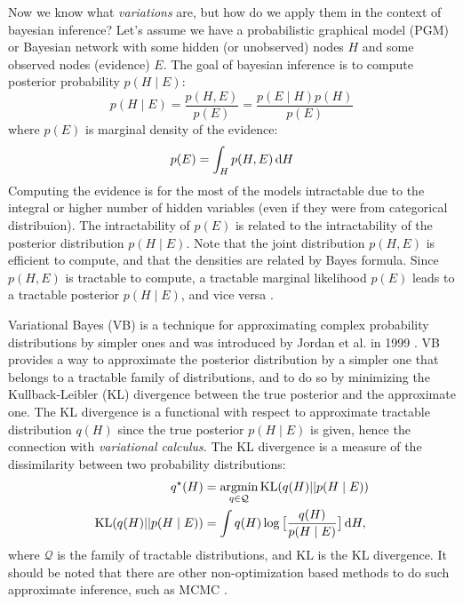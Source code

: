 Now we know what \textit{variations} are, but how do we apply them in the context of bayesian inference? Let's assume we have a probabilistic
graphical model (PGM) or Bayesian network \cite{graphical-models-2023} with some hidden (or unobserved) nodes $H$ and some observed nodes (evidence) $E$. The goal 
of bayesian inference is to compute posterior probability $p(H\mid E)$:
$$
p(H \mid E) = \frac{p(H,E)}{p(E)} = \frac{p(E\mid H) p(H)}{p(E)}
$$ 
where $p(E)$ is marginal density of the evidence:
$$
p(E) = \int_{H} p(H,E)\, \mbox{\rm d}H
$$
Computing the evidence is for the most of the models intractable due to the integral or higher number of hidden variables (even if they were from
categorical distribuion). The intractability of $p(E)$ is related to the intractability of the
posterior distribution $p(H \mid E)$. Note that the joint distribution $p(H, E)$ is efficient to compute, and that the densities are related by Bayes formula.
Since $p(H, E)$ is tractable to compute, a tractable marginal likelihood $p(E)$ leads to a tractable posterior $p(H \mid E)$, and vice versa \cite{intro-vae-2019,vb-intro-1999}.
 
Variational Bayes (VB) is a technique for approximating complex probability distributions by simpler ones and was introduced by Jordan et al. in 1999 \cite{vb-intro-1999}. 
VB provides a way to approximate the posterior distribution by a simpler one that belongs to a tractable family of distributions, and to do so
by minimizing the Kullback-Leibler (KL) divergence between the true posterior and the approximate one. The KL divergence is a functional with respect 
to approximate tractable distribution $q(H)$ since the true posterior $p(H \mid E)$ is given, hence the connection with \textit{variational calculus}.  
The KL divergence is a measure of the dissimilarity between two probability distributions:
\begin{align*}
q^\star(H) &= \mathop{\rm argmin}_{q \in \mathcal{Q}} \mathrm{KL}(q(H) || p(H  \mid  E)) \\
\mathrm{KL}(q(H) || p(H \mid E)) &= \int q(H) \log \big[ \frac{q(H)}{p(H \mid E)} \big]\,\mbox{\rm d}H,
\end{align*}
where $\mathcal{Q}$ is the family of tractable distributions, and $\mathrm{KL}$ is the KL divergence. It should be noted that there are other 
non-optimization based methods to do such approximate inference, such as MCMC \cite{wiki-mcmc-2023}. 

